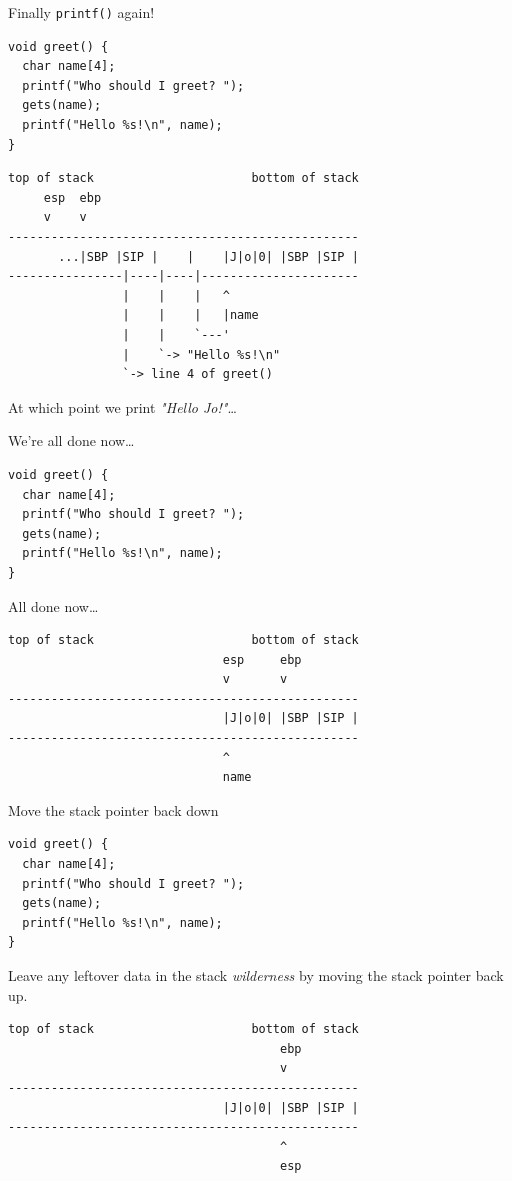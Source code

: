 \documentclass[9pt,aspectratio=169]{beamer}
\begin{document}
\begin{frame}[label={sec:orge94cea2},fragile]{Finally \texttt{printf()} again!}
 \begin{verbatim}
void greet() {
  char name[4];
  printf("Who should I greet? ");
  gets(name);
  printf("Hello %s!\n", name);
}
\end{verbatim}

\begin{verbatim}
top of stack                      bottom of stack
     esp  ebp
     v    v
-------------------------------------------------
       ...|SBP |SIP |    |    |J|o|0| |SBP |SIP |
----------------|----|----|----------------------
                |    |    |   ^
                |    |    |   |name
                |    |    `---'
                |    `-> "Hello %s!\n"    
                `-> line 4 of greet()
\end{verbatim}

At which point we print \emph{"Hello Jo!"}\ldots{}
\end{frame}

\begin{frame}[label={sec:org4fff6f5},fragile]{We're all done now\ldots{}}
 \begin{verbatim}
void greet() {
  char name[4];
  printf("Who should I greet? ");
  gets(name);
  printf("Hello %s!\n", name);
}
\end{verbatim}

All done now\ldots{}

\begin{verbatim}
top of stack                      bottom of stack
                              esp     ebp
                              v       v
-------------------------------------------------
                              |J|o|0| |SBP |SIP |
-------------------------------------------------
                              ^
                              name
\end{verbatim}
\end{frame}

\begin{frame}[label={sec:org394bb73},fragile]{Move the stack pointer back down}
 \begin{verbatim}
void greet() {
  char name[4];
  printf("Who should I greet? ");
  gets(name);
  printf("Hello %s!\n", name);
}
\end{verbatim}

Leave any leftover data in the stack \emph{wilderness} by moving the stack pointer back up.

\begin{verbatim}
top of stack                      bottom of stack
                                      ebp
                                      v
-------------------------------------------------
                              |J|o|0| |SBP |SIP |
-------------------------------------------------
                                      ^
                                      esp
\end{verbatim}
\end{frame}
\end{document}
